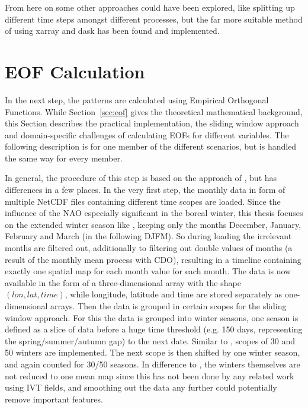 From here on some other approaches could have been explored, like splitting up different time steps amongst different processes, but the far more suitable method of using xarray and dask has been found and implemented.


\section{EOF Calculation}
\label{sec:eof_calc}

In the next step, the patterns are calculated using Empirical Orthogonal Functions. While Section~\ref{sec:eof} gives the theoretical mathematical background, this Section describes the practical implementation, the sliding window approach and domain-specific challenges of calculating EOFs for different variables. The following description is for one member of the different scenarios, but is handled the same way for every member.  


In general, the procedure of this step is based on the approach of \cite{vietinghoff_visual_2021}, but has differences in a few places. 
In the very first step, the monthly data in form of multiple NetCDF files containing different time scopes are loaded. 
Since the influence of the NAO especially significant in the boreal winter, this thesis focuses on the extended winter season like \cite{vietinghoff_visual_2021}, keeping only the months December, January, February and March (in the following DJFM). 
So during loading the irrelevant months are filtered out, additionally to filtering out double values of months (a result of the monthly mean process with CDO), resulting in a timeline containing exactly one spatial map for each month value for each month. 
The data is now available in the form of a three-dimensional array with the shape $(lon, lat, time)$, while longitude, latitude and time are stored separately as one-dimensional arrays. 
Then the data is grouped in certain scopes for the sliding window approach. 
For this the data is grouped into winter seasons, one season is defined as a slice of data before a huge time threshold (e.g. 150 days, representing the spring/summer/autumn gap) to the next date. 
Similar to \citeauthor{vietinghoff_visual_2021}, scopes of 30 and 50 winters are implemented.  
The next scope is then shifted by one winter season, and again counted for 30/50 seasons. 
In difference to \cite{vietinghoff_visual_2021}, the winters themselves are not reduced to one mean map since this has not been done by any related work using IVT fields, and smoothing out the data any further could potentially remove important features. 

